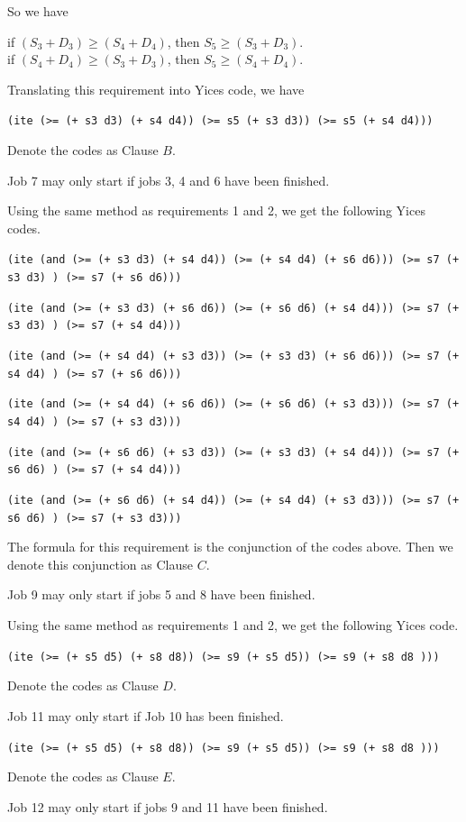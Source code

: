 \documentclass[11pt]{article}
\begin{document}
{\begin{description}
  So we have
  \begin{center}
  if $(S_{3}+D_{3}) \geq (S_{4}+D_{4})$, then $S_{5} \geq (S_{3}+D_{3})$.\\
  if $(S_{4}+D_{4}) \geq (S_{3}+D_{3})$, then $S_{5} \geq (S_{4}+D_{4})$.
  \end{center}
  Translating this requirement into Yices code, we have
  \begin{center}
  {\tt (ite (>= (+ s3 d3) (+ s4 d4)) (>= s5 (+ s3 d3)) (>= s5 (+ s4 d4)))}
  \end{center}
  Denote the codes as Clause $B$.
  \item[Requirement 5:] Job 7 may only start if jobs 3, 4 and 6 have been finished.

  Using the same method as requirements 1 and 2, we get the following Yices codes.
  \begin{center}
  {\tt (ite (and (>= (+ s3 d3) (+ s4 d4)) (>= (+ s4 d4) (+ s6 d6))) (>= s7 (+ s3 d3) ) (>= s7 (+ s6 d6)))}

  {\tt (ite (and (>= (+ s3 d3) (+ s6 d6)) (>= (+ s6 d6) (+ s4 d4))) (>= s7 (+ s3 d3) ) (>= s7 (+ s4 d4)))}

  {\tt (ite (and (>= (+ s4 d4) (+ s3 d3)) (>= (+ s3 d3) (+ s6 d6))) (>= s7 (+ s4 d4) ) (>= s7 (+ s6 d6)))}

  {\tt (ite (and (>= (+ s4 d4) (+ s6 d6)) (>= (+ s6 d6) (+ s3 d3))) (>= s7 (+ s4 d4) ) (>= s7 (+ s3 d3)))}

  {\tt (ite (and (>= (+ s6 d6) (+ s3 d3)) (>= (+ s3 d3) (+ s4 d4))) (>= s7 (+ s6 d6) ) (>= s7 (+ s4 d4)))}

  {\tt (ite (and (>= (+ s6 d6) (+ s4 d4)) (>= (+ s4 d4) (+ s3 d3))) (>= s7 (+ s6 d6) ) (>= s7 (+ s3 d3)))}
  \end{center}
  The formula for this requirement is the conjunction of the codes above. Then we denote this conjunction as Clause $C$.
  \item[Requirement 6:] Job 9 may only start if jobs 5 and 8 have been finished.

  Using the same method as requirements 1 and 2, we get the following Yices code.
  \begin{center}
  {\tt (ite (>= (+ s5 d5) (+ s8 d8)) (>= s9 (+ s5 d5)) (>= s9 (+ s8 d8 )))}
  \end{center}
  Denote the codes as Clause $D$.
  \item[Requirement 7:] Job 11 may only start if Job 10 has been finished.

  \begin{center}
  {\tt (ite (>= (+ s5 d5) (+ s8 d8)) (>= s9 (+ s5 d5)) (>= s9 (+ s8 d8 )))}
  \end{center}
  Denote the codes as Clause $E$.
  \item[Requirement 8:] Job 12 may only start if jobs 9 and 11 have been finished.


\end{description}}
\end{document}
